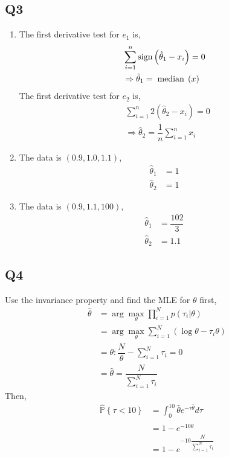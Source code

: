 \documentclass{article}
\begin{document}
\subsection{Q3}
\begin{enumerate}
\item The first derivative test for $e_{1}$ is,
\begin{align*}
&  \displaystyle\sum_{i=1}^{n} \text{sign}\left(\hat{\theta}_{1} - x_{i}\right) = 0
\\ &\Rightarrow  \hat{\theta}_{1} = \text{\;median\;}\left(x\right)
\end{align*}
The first derivative test for $e_{2}$ is,
\begin{align*}
&  \displaystyle\sum_{i=1}^{n} 2 \left(\hat{\theta}_{2}  - x_{i}\right) = 0
\\ &\Rightarrow  \hat{\theta}_{2} = \dfrac{1}{n} \displaystyle\sum_{i=1}^{n} x_{i}
\end{align*}
\item The data is $\left(0.9, 1.0, 1.1\right)$,
\begin{align*}
\hat{\theta}_{1} &= 1
\\ \hat{\theta}_{2} &= 1
\end{align*}
\item The data is $\left(0.9, 1.1, 100\right)$,
\begin{align*}
\hat{\theta}_{1} &= \dfrac{102}{3}
\\ \hat{\theta}_{2} &= 1.1
\end{align*}
\end{enumerate}


\subsection{Q4}
Use the invariance property and find the MLE for $\theta$ first,
\begin{align*}
\hat{\theta} &= \arg\displaystyle\max_{\theta} \displaystyle\prod_{i=1}^{N} p\left(\tau_{i} | \theta\right)
\\ &= \arg\displaystyle\max_{\theta} \displaystyle\sum_{i=1}^{N} \left(\log \theta - \tau_{i} \theta\right)
\\ &= \theta : \dfrac{N}{\theta} - \displaystyle\sum_{i=1}^{N} \tau_{i} = 0
\\ &= \hat{\theta} = \dfrac{N}{\displaystyle\sum_{i=1}^{N} \tau_{i}}
\end{align*}
Then,
\begin{align*}
\hat{\mathbb{P}}\left\{\tau < 10\right\} &= \displaystyle\int_{0}^{10} \hat{\theta} e^{-\tau \hat{\theta}} d \tau
\\ &= 1 - e^{-10 \hat{\theta}}
\\ &= 1 - e^{-10 \dfrac{N}{\displaystyle\sum_{i=1}^{N} \tau_{i}}}
\end{align*}
\end{document}
